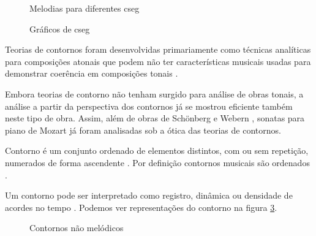 \begin{figure}
  \centering

  \caption{Melodias para diferentes cseg}
  \label{fig:melodias-cseg}
\end{figure}

\begin{figure}
  \centering
  \caption{Gráficos de cseg}
  \label{fig:graficos-cseg}
\end{figure}


Teorias de contornos foram desenvolvidas primariamente como técnicas
analíticas para composições atonais que podem não ter características
musicais usadas para demonstrar coerência em composições tonais
\cite[p. 1]{beard03:contour}.

Embora teorias de contorno não tenham surgido para análise de obras
tonais, a análise a partir da perspectiva dos contornos já se mostrou
eficiente também neste tipo de obra. Assim, além de obras de Schönberg
\cite{friedmann85:methodology} e Webern \cite{clifford95:contour},
sonatas para piano de Mozart \cite{beard03:contour} já foram
analisadas sob a ótica das teorias de contornos.

Contorno é um conjunto ordenado de elementos distintos, com ou sem
repetição, numerados de forma ascendente
\cite[p. 206]{morris93:directions}. Por definição contornos musicais
são ordenados \cite[p. 228]{marvin.ea87:relating}.

Um contorno pode ser interpretado como registro, dinâmica ou densidade
de acordes no tempo \cite[p. 206]{morris93:directions}
\cite[p. 22]{clifford95:contour}. Podemos ver representações do
contorno  na figura
\ref{fig:non-melodic-contours}.

\begin{figure}
  \centering

  \caption{Contornos  não melódicos}
  \label{fig:non-melodic-contours}
\end{figure}


